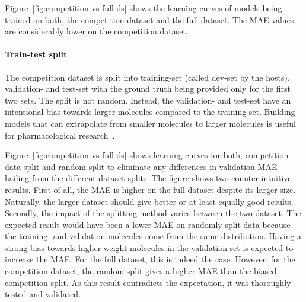 Figure~\ref{fig:competition-vs-full-ds} shows the learning curves of models being trained on both, the competition dataset and the full dataset. The MAE values are considerably lower on the competition dataset.

\paragraph*{Train-test split}
The competition dataset is split into training-set (called dev-set by the hosts), validation- and test-set with the ground truth being provided only for the first two sets. The split is not random. Instead, the validation- and test-set have an intentional bias towards larger molecules compared to the training-set. Building models that can extrapolate from smaller molecules to larger molecules is useful for pharmacological research~\cite{Chen2019}.

Figure~\ref{fig:competition-vs-full-ds} shows learning curves for both, competition-data split and random split to eliminate any differences in validation MAE hailing from the different dataset splits.
The figure shows two counter-intuitive results. First of all, the MAE is higher on the full dataset despite its larger size. Naturally, the larger dataset should give better or at least equally good results. Secondly, the impact of the splitting method varies between the two dataset. The expected result would have been a lower MAE on randomly split data because the training- and validation-molecules come from the same distribution. Having a strong bias towards higher weight molecules in the validation set is expected to increase the MAE. For the full dataset, this is indeed the case. However, for the competition dataset, the random split gives a higher MAE than the biased competition-split. As this result contradicts the expectation, it was thoroughly tested and validated.



